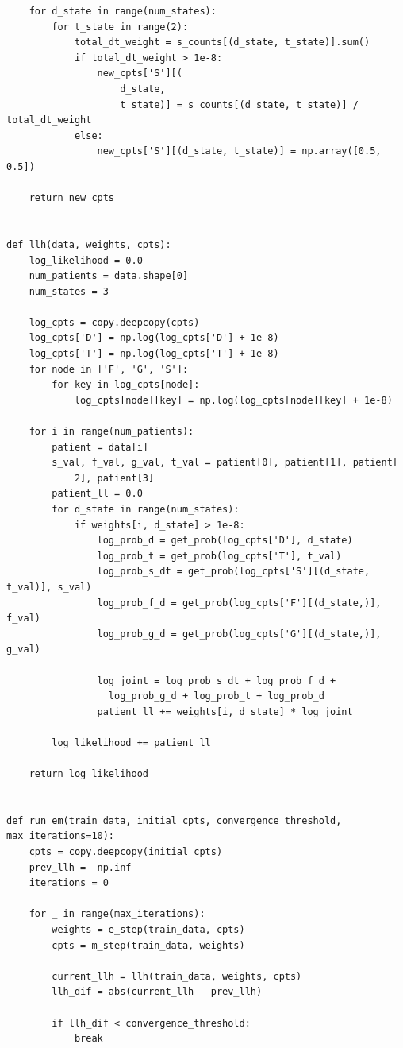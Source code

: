 \documentclass[11pt]{article}
\begin{document}
\begin{verbatim}
    for d_state in range(num_states):
        for t_state in range(2):
            total_dt_weight = s_counts[(d_state, t_state)].sum()
            if total_dt_weight > 1e-8:
                new_cpts['S'][(
                    d_state,
                    t_state)] = s_counts[(d_state, t_state)] / total_dt_weight
            else:
                new_cpts['S'][(d_state, t_state)] = np.array([0.5, 0.5])

    return new_cpts


def llh(data, weights, cpts):
    log_likelihood = 0.0
    num_patients = data.shape[0]
    num_states = 3

    log_cpts = copy.deepcopy(cpts)
    log_cpts['D'] = np.log(log_cpts['D'] + 1e-8)
    log_cpts['T'] = np.log(log_cpts['T'] + 1e-8)
    for node in ['F', 'G', 'S']:
        for key in log_cpts[node]:
            log_cpts[node][key] = np.log(log_cpts[node][key] + 1e-8)

    for i in range(num_patients):
        patient = data[i]
        s_val, f_val, g_val, t_val = patient[0], patient[1], patient[
            2], patient[3]
        patient_ll = 0.0
        for d_state in range(num_states):
            if weights[i, d_state] > 1e-8:
                log_prob_d = get_prob(log_cpts['D'], d_state)
                log_prob_t = get_prob(log_cpts['T'], t_val)
                log_prob_s_dt = get_prob(log_cpts['S'][(d_state, t_val)], s_val)
                log_prob_f_d = get_prob(log_cpts['F'][(d_state,)], f_val)
                log_prob_g_d = get_prob(log_cpts['G'][(d_state,)], g_val)

                log_joint = log_prob_s_dt + log_prob_f_d +
                  log_prob_g_d + log_prob_t + log_prob_d
                patient_ll += weights[i, d_state] * log_joint

        log_likelihood += patient_ll

    return log_likelihood


def run_em(train_data, initial_cpts, convergence_threshold, max_iterations=10):
    cpts = copy.deepcopy(initial_cpts)
    prev_llh = -np.inf
    iterations = 0

    for _ in range(max_iterations):
        weights = e_step(train_data, cpts)
        cpts = m_step(train_data, weights)

        current_llh = llh(train_data, weights, cpts)
        llh_dif = abs(current_llh - prev_llh)

        if llh_dif < convergence_threshold:
            break


\end{verbatim}
\end{document}
